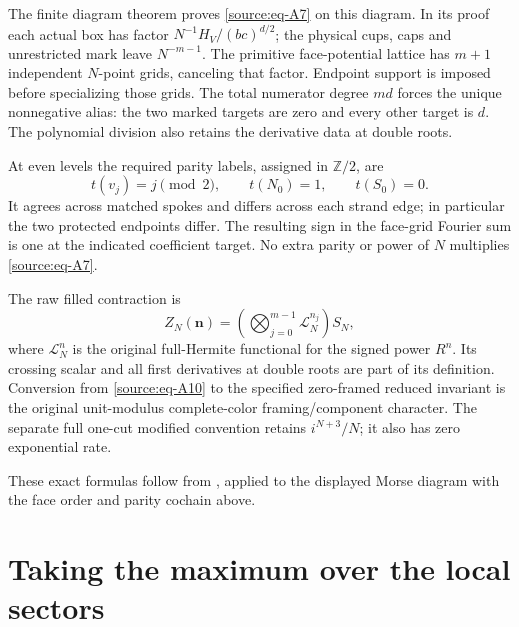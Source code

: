 \documentclass[11pt]{article}
\numberwithin{equation}{section}
\begin{document}
The finite diagram theorem proves \eqref{source:eq-A7} on this diagram. In its proof
each actual box has factor \(N^{-1}H_V/(bc)^{d/2}\); the physical cups,
caps and unrestricted mark leave \(N^{-m-1}\). The primitive
face-potential lattice has \(m+1\) independent \(N\)-point grids,
canceling that factor. Endpoint support is imposed before specializing
those grids. The total numerator degree \(md\) forces the unique
nonnegative alias: the two marked targets are zero and every other
target is \(d\). The polynomial division also retains the derivative data at double roots.

At even levels the required parity labels, assigned in $\mathbb Z/2$, are \begin{equation}\label{source:eq-A9}
t(v_j)=j\pmod2,\qquad t(N_0)=1,\qquad t(S_0)=0.
\end{equation} It agrees across matched spokes and differs across each strand edge;
in particular the two protected endpoints differ. The resulting sign in the face-grid Fourier sum is one at the indicated coefficient target. No extra parity or
power of \(N\) multiplies \eqref{source:eq-A7}.

The raw filled contraction is \begin{equation}\label{source:eq-A10}
Z_N(\mathbf n)=
       \left(\bigotimes_{j=0}^{m-1}\mathcal L_N^{n_j}\right)S_N,
\end{equation} where \(\mathcal L_N^n\) is the original full-Hermite functional for
the signed power \(R^n\). Its crossing scalar and all first derivatives
at double roots are part of its definition. Conversion from \eqref{source:eq-A10} to the
specified zero-framed reduced invariant is the original unit-modulus
complete-color framing/component character. The separate full one-cut
modified convention retains \(i^{N+3}/N\); it also has zero exponential
rate.

These exact formulas follow from \cite[Sections 9--10]{FillingPaper},
applied to the displayed Morse diagram with the face order and parity
cochain above.

\section{Taking the maximum over the local sectors}\label{source:sec-3}
\end{document}

